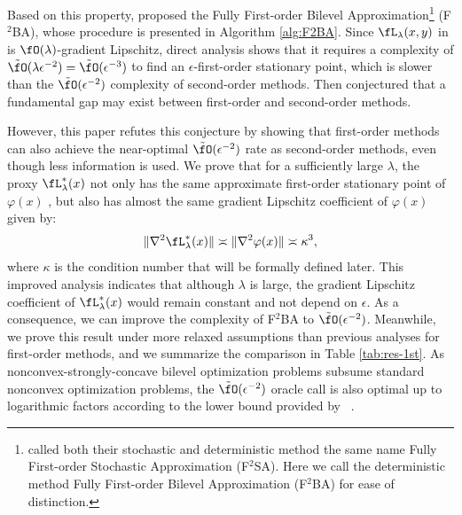 \documentclass{article}
\begin{document}
 Based on this property, \citet{kwon2023fully} proposed the Fully First-order Bilevel Approximation\footnote{
\citet{kwon2023fully} called  both their 
stochastic and deterministic method the same name Fully First-order Stochastic Approximation
(F${}^2$SA). Here we 
call the deterministic method Fully First-order Bilevel Approximation (F${}^2$BA) for ease of distinction.} (F${}^2$BA), whose procedure is presented in Algorithm \ref{alg:F2BA}. 
Since $\fL_{\lambda}(x,y)$ in  is $\fO(\lambda)$-gradient Lipschitz, direct analysis shows that it requires a complexity of $\tilde \fO(\lambda \epsilon^{-2}) = \tilde \fO(\epsilon^{-3} )$ to find an $\epsilon$-first-order stationary point, which is slower than the $\tilde \fO(\epsilon^{-2})$ complexity of second-order methods. Then \citet{kwon2023fully} conjectured that a fundamental gap may exist between first-order and second-order methods.  

However, this paper refutes this conjecture by showing that first-order methods can also achieve the near-optimal $\tilde \fO(\epsilon^{-2})$ rate as second-order methods, even though less information is used.
We prove that for a sufficiently large $\lambda$, the proxy $\fL_{\lambda}^*(x)$ not only has the same approximate first-order stationary point of $\varphi(x)$ , but also has almost the same gradient Lipschitz coefficient of $\varphi(x)$ given by:
\begin{align*}
    \Vert \nabla^2 \fL_{\lambda}^*(x) \Vert \asymp \Vert \nabla^2 \varphi(x) \Vert \asymp \kappa^3,
\end{align*}
where $\kappa$ is the condition number that will be formally defined later. This improved analysis indicates that although $\lambda$ is large, the gradient Lipschitz coefficient of $\fL_{\lambda}^*(x)$ would remain constant and not depend on $\epsilon$. As a consequence, we can improve the complexity of F${}^2$BA to $\tilde \fO(\epsilon^{-2})$. Meanwhile, we prove this result
under more relaxed assumptions than previous analyses for first-order methods, and we
summarize the comparison in Table \ref{tab:res-1st}.
As nonconvex-strongly-concave bilevel optimization problems subsume standard nonconvex optimization problems, the $\tilde \fO(\epsilon^{-2})$ oracle call is also optimal up to logarithmic factors according to the lower bound provided by ~\cite{carmon2020lower}.
\end{document}
